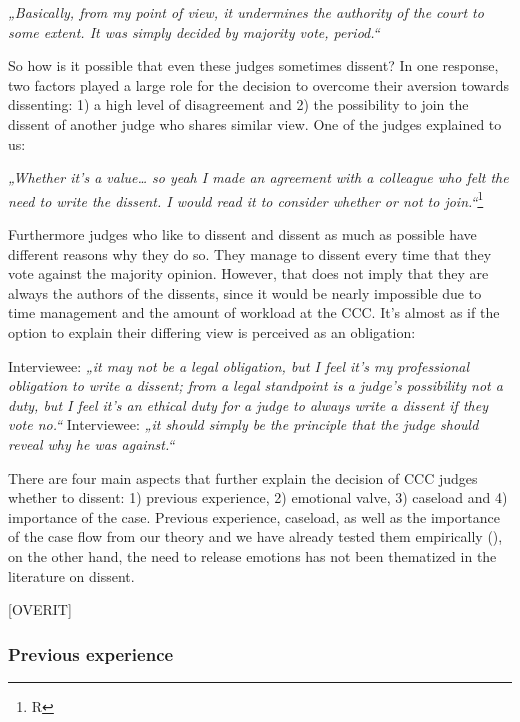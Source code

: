 \documentclass[
  11pt,
]{article}
\begin{document}
\emph{„Basically, from my point of view, it undermines the authority of the court to some extent. It was simply decided by majority vote, period.``}

So how is it possible that even these judges sometimes dissent? In one response, two factors played a large role for the decision to overcome their aversion towards dissenting: 1) a high level of disagreement and 2) the possibility to join the dissent of another judge who shares similar view. One of the judges explained to us:

\emph{„Whether it's a value\ldots{} so yeah I made an agreement with a colleague who felt the need to write the dissent. I would read it to consider whether or not to join.``}\footnote{R}

Furthermore judges who like to dissent and dissent as much as possible have different reasons why they do so. They manage to dissent every time that they vote against the majority opinion. However, that does not imply that they are always the authors of the dissents, since it would be nearly impossible due to time management and the amount of workload at the CCC. It's almost as if the option to explain their differing view is perceived as an obligation:

Interviewee: \emph{„it may not be a legal obligation, but I feel it's my professional obligation to write a dissent; from a legal standpoint is a judge's possibility not a duty, but I feel it's an ethical duty for a judge to always write a dissent if they vote no.``}
Interviewee: \emph{„it should simply be the principle that the judge should reveal why he was against.``}

There are four main aspects that further explain the decision of CCC judges whether to dissent: 1) previous experience, 2) emotional valve, 3) caseload and 4) importance of the case. Previous experience, caseload, as well as the importance of the case flow from our theory and we have already tested them empirically (), on the other hand, the need to release emotions has not been thematized in the literature on dissent.

{[}OVERIT{]}

\subsubsection{Previous experience}\label{previous-experience}
\end{document}
